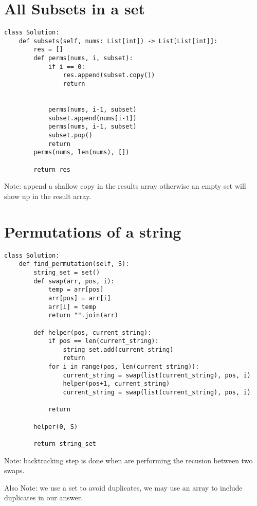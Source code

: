 \documentclass[a4]{article}
\begin{document}
\section{All Subsets in a set}
\begin{lstlisting}
class Solution:
    def subsets(self, nums: List[int]) -> List[List[int]]:
        res = []
        def perms(nums, i, subset):
            if i == 0:
                res.append(subset.copy())
                return
                
            
            perms(nums, i-1, subset)
            subset.append(nums[i-1])
            perms(nums, i-1, subset)
            subset.pop()
            return
        perms(nums, len(nums), [])
        
        return res
\end{lstlisting}
Note: append a shallow copy in the results array otherwise an empty set will show up in the result array.


\newpage

\section{Permutations of a string}
\begin{lstlisting}
class Solution:
    def find_permutation(self, S):
        string_set = set()
        def swap(arr, pos, i):
            temp = arr[pos]
            arr[pos] = arr[i]
            arr[i] = temp
            return "".join(arr)

        def helper(pos, current_string):
            if pos == len(current_string):
                string_set.add(current_string)
                return
            for i in range(pos, len(current_string)):
                current_string = swap(list(current_string), pos, i)
                helper(pos+1, current_string)
                current_string = swap(list(current_string), pos, i)

            return
        
        helper(0, S)
        
        return string_set
\end{lstlisting}
Note: backtracking step is done when are performing the recusion between two swaps.

Also Note: we use a set to avoid duplicates, we may use an array to include duplicates in our answer.

\newpage
\end{document}
